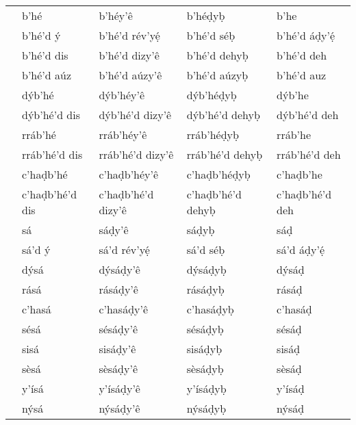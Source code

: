\documentclass[a4paper, 12pt, twoside, openright, final]{book}
\let \nf \normalfont
\begin{document}
{\begin{longtable}{>{\nf}l|l|l|l|l}
    20     & b’hé            & b’héy’ê            & b’héḍyḅ           & b’he            \\
    21     & b’hé’d ý        & b’hé’d rév’yẹ́      & b’hé’d séḅ        & b’hé’d áḍy’ẹ́    \\
    30     & b’hé’d dis      & b’hé’d dizy’ê      & b’hé’d dehyḅ      & b’hé’d deh      \\
    31     & b’hé’d aúz      & b’hé’d aúzy’ê      & b’hé’d aúzyḅ      & b’hé’d auz      \\
    40     & dýb’hé          & dýb’héy’ê          & dýb’héḍyḅ         & dýb’he          \\
    50     & dýb’hé’d dis    & dýb’hé’d dizy’ê    & dýb’hé’d dehyḅ    & dýb’hé’d deh    \\
    60     & rráb’hé         & rráb’héy’ê         & rráb’héḍyḅ        & rráb’he         \\
    70     & rráb’hé’d dis   & rráb’hé’d dizy’ê   & rráb’hé’d dehyḅ   & rráb’hé’d deh   \\
    80     & c’haḍb’hé       & c’haḍb’héy’ê       & c’haḍb’héḍyḅ      & c’haḍb’he       \\
    90     & c’haḍb’hé’d dis & c’haḍb’hé’d dizy’ê & c’haḍb’hé’d dehyḅ & c’haḍb’hé’d deh \\\hline
    100    & sá              & sáḍy’ê             & sáḍyḅ             & sáḍ             \\
    101    & sá’d ý          & sá’d rév’yẹ́        & sá’d séḅ          & sá’d áḍy’ẹ́      \\
    200    & dýsá            & dýsáḍy’ê           & dýsáḍyḅ           & dýsáḍ           \\
    300    & rásá            & rásáḍy’ê           & rásáḍyḅ           & rásáḍ           \\
    400    & c’hasá          & c’hasáḍy’ê         & c’hasáḍyḅ         & c’hasáḍ         \\
    500    & sésá            & sésáḍy’ê           & sésáḍyḅ           & sésáḍ           \\
    600    & sisá            & sisáḍy’ê           & sisáḍyḅ           & sisáḍ           \\
    700    & sèsá            & sèsáḍy’ê           & sèsáḍyḅ           & sèsáḍ           \\
    800    & y’ísá           & y’ísáḍy’ê          & y’ísáḍyḅ          & y’ísáḍ          \\
    900    & nýsá            & nýsáḍy’ê           & nýsáḍyḅ           & nýsáḍ           \\\hline

\end{longtable}}
\end{document}

